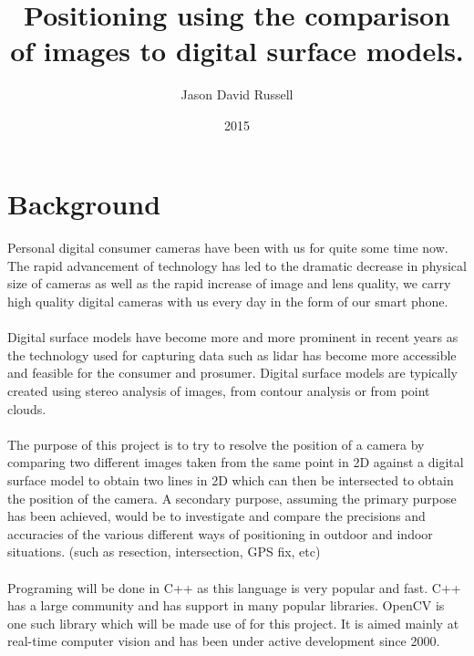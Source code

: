 \documentclass{article}
\title{Positioning using the comparison of images to digital surface models.}
\date{2015}
\author{Jason David Russell}
\begin{document}
\maketitle
{}

\newpage
\tableofcontents

\newpage
{}

\section{Background}
\paragraph{}
Personal digital consumer cameras have been with us for quite some time now. The rapid advancement of technology has led to the dramatic decrease in physical size of cameras as well as the rapid increase of image and lens quality, we carry high quality digital cameras with us every day in the form of our smart phone.

\paragraph{}
Digital surface models have become more and more prominent in recent years as the technology used for capturing data such as lidar has become more accessible and feasible for the consumer and prosumer. Digital surface models are typically created using stereo analysis of images, from contour analysis or from point clouds.

\paragraph{}
The purpose of this project is to try to resolve the position of a camera by comparing two different images taken from the same point in 2D against a digital surface model to obtain two lines in 2D which can then be intersected to obtain the position of the camera. A secondary purpose, assuming the primary purpose has been achieved, would be to investigate and compare the precisions and accuracies of the various different ways of positioning in outdoor and indoor situations. (such as resection, intersection, GPS fix, etc)

\paragraph{}
Programing will be done in C++ as this language is very popular and fast. C++ has a large community and has support in many popular libraries. OpenCV is one such library which will be made use of for this project. It is aimed mainly at real-time computer vision and has been under active development since 2000. 
\end{document}
